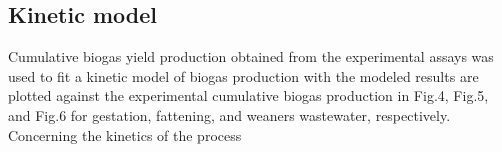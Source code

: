 \subsection{Kinetic model}
Cumulative biogas yield production obtained from the experimental assays was used to fit a kinetic model of biogas production with the  modeled results are plotted against the experimental cumulative biogas production in Fig.4, Fig.5, and Fig.6 for gestation, fattening, and weaners wastewater, respectively.
Concerning the kinetics of the process